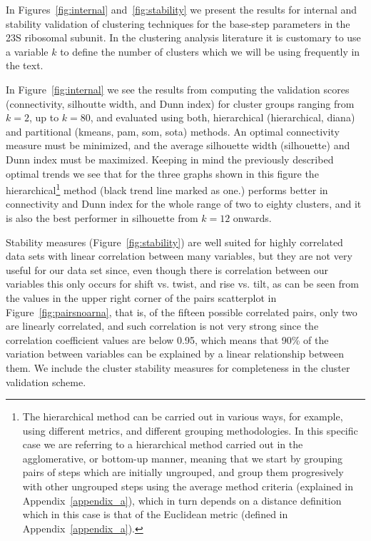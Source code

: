 In  Figures~\ref{fig:internal} and~\ref{fig:stability} we  present the
results for internal and stability validation of clustering techniques
for the  base-step parameters  in the 23S  ribosomal subunit.   In the
clustering analysis literature  it is customary to use  a variable $k$
to define the number of clusters  which we will be using frequently in
the text.

In  Figure~\ref{fig:internal} we  see the  results from  computing the
validation scores (connectivity, silhoutte  width, and Dunn index) for
cluster groups ranging  from $k=2$, up to $k=80$,  and evaluated using
both, hierarchical (hierarchical, diana) and partitional (kmeans, pam,
som, sota) methods. An optimal connectivity measure must be minimized,
and the average  silhouette width (silhouette) and Dunn  index must be
maximized.  Keeping in mind the previously described optimal trends we
see  that  for   the  three  graphs  shown  in   this  figure  the
hierarchical\footnote{The  hierarchical method can  be carried  out in
  various ways,  for example,  using different metrics,  and different
  grouping methodologies.  In this specific case we are referring to a
  hierarchical method  carried out in the  agglomerative, or bottom-up
  manner, meaning that  we start by grouping pairs  of steps which are
  initially  ungrouped,   and  group  them   progresively  with  other
  ungrouped  steps using  the  average method  criteria (explained  in
  Appendix~\ref{appendix_a}),  which  in turn  depends  on a  distance
  definition  which in  this  case  is that  of  the Euclidean  metric
  (defined in  Appendix~\ref{appendix_a}).}  method (black  trend line
marked  as one.)  performs  better in connectivity and  Dunn index
for the whole range of two to eighty clusters, and it is also the best
performer in silhouette from $k=12$ onwards.

Stability  measures (Figure~\ref{fig:stability})  are well  suited for
highly  correlated  data sets  with  linear  correlation between  many
variables, but they  are not very useful for our  data set since, even
though there is correlation between our variables this only occurs for
shift vs. twist, and rise vs. tilt,  as can be seen from the values in
the    upper   right    corner   of    the   pairs    scatterplot   in
Figure~\ref{fig:pairsnoarna},  that   is,  of  the   fifteen  possible
correlated  pairs,   only  two  are  linearly   correlated,  and  such
correlation  is  not very  strong  since  the correlation  coefficient
values are below 0.95, which  means that 90\% of the variation between
variables can be  explained by a linear relationship  between them. We
include the cluster stability measures for completeness in the cluster
validation scheme.

